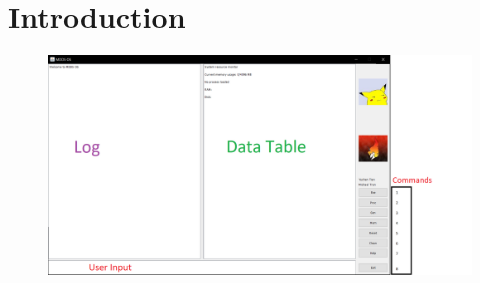 \documentclass[10pt]{article}
\title{
\vspace{2in}
\textmd{\textbf{\projecttitle} \\}
\vspace{5in}
}
\author{\textbf{\hmwkAuthorName}}
\date{} %
\begin{document}
\maketitle








\newpage

\tableofcontents

\newpage













\section{Introduction}

\begin{figure}[H]
	\centering
	\includegraphics[width=\linewidth]{Untitled}
\end{figure}
\end{document}
